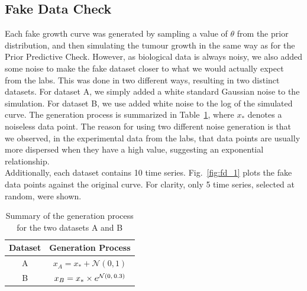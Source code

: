 \documentclass[11pt]{article}
\begin{document}
\subsection{Fake Data Check}
Each fake growth curve was generated by sampling a value of $\theta$ from the prior distribution, and then simulating the tumour growth in the same way as for the Prior Predictive Check. However, as biological data is always noisy, we also added some noise to make the fake dataset closer to what we would actually expect from the labs. This was done in two different ways, resulting in two distinct datasets. For dataset A, we simply added a white standard Gaussian noise to the simulation. For dataset B, we use added white noise to the log of the simulated curve. The generation process is summarized in Table~\ref{tbl:genproc}, where $x_*$ denotes a noiseless data point. The reason for using two different noise generation is that we observed, in the experimental data from the labs, that data points are usually more dispersed when they have a high value, suggesting an exponential relationship. \\ 
Additionally, each dataset contains 10 time series. Fig.~\ref{fig:fd_1} plots the fake data points against the original curve. For clarity, only 5 time series, selected at random, were shown.
\begin{table}[h!]
    \centering
    \caption{Summary of the generation process for the two datasets A and B}
    \begin{tabular}{c|c}
        \hline
        Dataset & Generation Process \\ \hline 
        A       & $x_A=x_*+\mathcal{N}(0,1)$ \\
        B       & $x_B=x_*\times e^{\mathcal{N}(0,\hspace{1.5px}0.3)}$ \\ \hline
    \end{tabular}
    \label{tbl:genproc}
\end{table}
\end{document}
